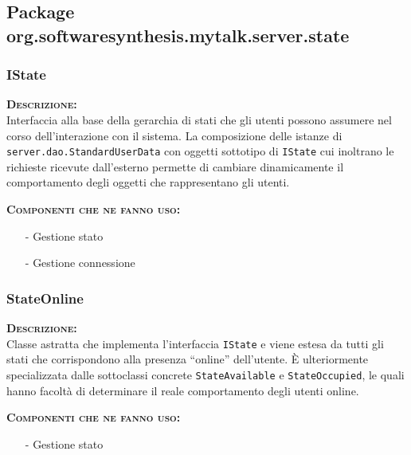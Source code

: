 \subsection{Package org.softwaresynthesis.mytalk.server.state}
\subsubsection{IState}
\begin{description}
	\item{\scshape\bfseries Descrizione:}\\
Interfaccia alla base della gerarchia di stati che gli utenti possono assumere nel corso dell'interazione con il sistema. La composizione delle istanze di \texttt{server.dao.StandardUserData} con oggetti sottotipo di \texttt{IState} cui inoltrano le richieste ricevute dall'esterno permette di cambiare dinamicamente il comportamento degli oggetti che rappresentano gli utenti.
	\item{\scshape\bfseries Componenti che ne fanno uso:}
	\begin{itemize}[noitemsep,nolistsep]
	  \item[-] Gestione stato
	  \item[-] Gestione connessione
	\end{itemize}
\end{description}

\subsubsection{StateOnline}
\begin{description}
	\item{\scshape\bfseries Descrizione:}\\
Classe astratta che implementa l'interfaccia \texttt{IState} e viene estesa da tutti gli stati che corrispondono alla presenza ``online'' dell'utente. È ulteriormente specializzata dalle sottoclassi concrete \texttt{StateAvailable} e \texttt{StateOccupied}, le quali hanno facoltà di determinare il reale comportamento degli utenti online.
	\item{\scshape\bfseries Componenti che ne fanno uso:}
	\begin{itemize}[noitemsep,nolistsep]
	  \item[-] Gestione stato
	\end{itemize}
\end{description}

